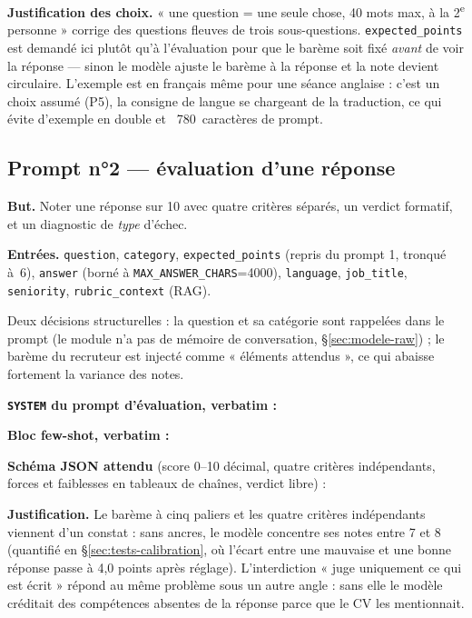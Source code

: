 \textbf{Justification des choix.} « une question = une seule chose, 40 mots
max, à la 2\textsuperscript{e} personne » corrige des questions fleuves de trois
sous-questions. \texttt{expected\_points} est demandé ici plutôt qu'à
l'évaluation pour que le barème soit fixé \emph{avant} de voir la réponse ---
sinon le modèle ajuste le barème à la réponse et la note devient circulaire.
L'exemple est en français même pour une séance anglaise : c'est un choix
assumé (P5), la consigne de langue se chargeant de la traduction, ce qui évite
d'exemple en double et ~780~caractères de prompt.

\subsection{Prompt n°2 --- évaluation d'une réponse}
\label{sec:prompt-evaluate}

\textbf{But.} Noter une réponse sur 10 avec quatre critères séparés, un
verdict formatif, et un diagnostic de \emph{type} d'échec.

\textbf{Entrées.} \texttt{question}, \texttt{category}, \texttt{expected\_points}
(repris du prompt 1, tronqué à~6), \texttt{answer} (borné à
\texttt{MAX\_ANSWER\_CHARS}=4000), \texttt{language}, \texttt{job\_title},
\texttt{seniority}, \texttt{rubric\_context} (RAG).

Deux décisions structurelles : la question et sa catégorie sont rappelées dans
le prompt (le module n'a pas de mémoire de conversation, §\ref{sec:modele-raw}) ;
le barème du recruteur est injecté comme « éléments attendus », ce qui abaisse
fortement la variance des notes.

\textbf{\texttt{SYSTEM} du prompt d'évaluation, verbatim :}


\textbf{Bloc few-shot, verbatim :}


\textbf{Schéma JSON attendu} (score 0--10 décimal, quatre critères indépendants,
forces et faiblesses en tableaux de chaînes, verdict libre) :


\textbf{Justification.} Le barème à cinq paliers et les quatre critères
indépendants viennent d'un constat : sans ancres, le modèle concentre ses notes
entre 7 et 8 (quantifié en §\ref{sec:tests-calibration}, où l'écart entre une
mauvaise et une bonne réponse passe à 4,0 points après réglage).
L'interdiction « juge uniquement ce qui est écrit » répond au même problème sous
un autre angle : sans elle le modèle créditait des compétences absentes de la
réponse parce que le CV les mentionnait.

